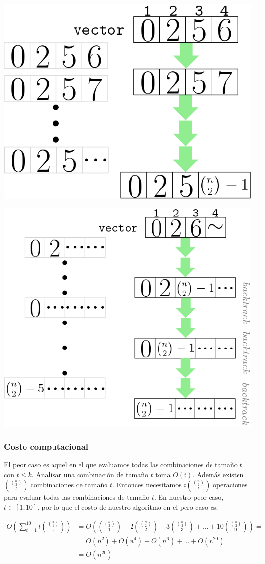 \begin{frame}
\centering
\includegraphics[width=0.8\linewidth]{images/example_algoritmo3}
\end{frame}
\begin{frame}
\centering
\includegraphics[width=0.8\linewidth]{images/example_algoritmo4}
\end{frame}
\begin{frame}\frametitle{Costo computacional}
El peor caso es aquel en el que evaluamos todas las combinaciones de tamaño $t$ con $t \leq k$. Analizar una combinación de tamaño $t$ toma $O(t)$. Además existen $\displaystyle \binom{\binom{n}{2}}{t}$ combinaciones de tamaño $t$. Entonces necesitamos $\displaystyle t\binom{\binom{n}{2}}{t}$ operaciones para evaluar todas las combinaciones de tamaño $t$. En nuestro peor caso, $t\in[1,10]$, por lo que el costo de nuestro algoritmo en el pero caso es:

\begin{align*}
	\displaystyle O\left( \sum_{t=1}^{10} t\binom{\binom{n}{2}}{t} \right) &= 
	O\left(\binom{\binom{n}{2}}{1} + 2\binom{\binom{n}{2}}{2} + 3\binom{\binom{n}{2}}{3} +\dots+ 10\binom{\binom{n}{2}}{10} \right) = \\ &=
	 O(n^2)+ O(n^4)+ O(n^6) + \dots + O(n^{20}) = \\ &=O(n^{20})
\end{align*}

\end{frame}
